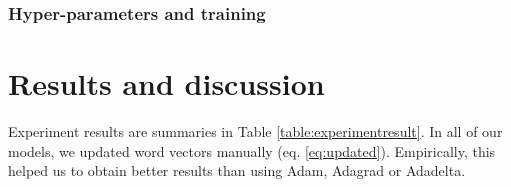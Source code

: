 \subsubsection{Hyper-parameters and training}
\section{Results and discussion}
Experiment results are summaries in Table \ref{table:experimentresult}. In all of our models, we updated word vectors manually (eq. \ref{eq:updated}).
Empirically, this helped us to obtain better results than using Adam, Adagrad or Adadelta.


